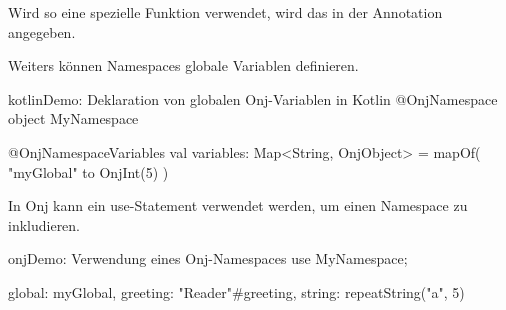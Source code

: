 Wird so eine spezielle Funktion verwendet, wird das in der  Annotation angegeben.


Weiters können Namespaces globale Variablen definieren.

\begin{codeBlock}{kotlin}{Demo: Deklaration von globalen Onj-Variablen in Kotlin}
@OnjNamespace
object MyNamespace {

    @OnjNamespaceVariables
    val variables: Map<String, OnjObject> = mapOf(
        "myGlobal" to OnjInt(5)
    )
}
\end{codeBlock}

In Onj kann ein use-Statement verwendet werden, um einen Namespace zu inkludieren.

\begin{codeBlock}{onj}{Demo: Verwendung eines Onj-Namespaces}
use MyNamespace;

global: myGlobal,
greeting: "Reader"#greeting,
string: repeatString("a", 5)
\end{codeBlock}

\renewcommand{\kapitelautor}{}
